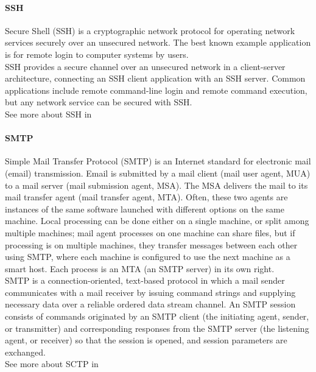\paragraph{SSH} 
Secure Shell (SSH) is a cryptographic network protocol for operating network services securely over an unsecured network. The best known example application is for remote login to computer systems by users.
\\
SSH provides a secure channel over an unsecured network in a client-server architecture, connecting an SSH client application with an SSH server. Common applications include remote command-line login and remote command execution, but any network service can be secured with SSH. 
\\
See more about SSH in \cite{SSH}


\paragraph{SMTP} 
Simple Mail Transfer Protocol (SMTP) is an Internet standard for electronic mail (email) transmission. Email is submitted by a mail client (mail user agent, MUA) to a mail server (mail submission agent, MSA). The MSA delivers the mail to its mail transfer agent (mail transfer agent, MTA). Often, these two agents are instances of the same software launched with different options on the same machine. Local processing can be done either on a single machine, or split among multiple machines; mail agent processes on one machine can share files, but if processing is on multiple machines, they transfer messages between each other using SMTP, where each machine is configured to use the next machine as a smart host. Each process is an MTA (an SMTP server) in its own right.
\\
SMTP is a connection-oriented, text-based protocol in which a mail sender communicates with a mail receiver by issuing command strings and supplying necessary data over a reliable ordered data stream channel. An SMTP session consists of commands originated by an SMTP client (the initiating agent, sender, or transmitter) and corresponding responses from the SMTP server (the listening agent, or receiver) so that the session is opened, and session parameters are exchanged.
\\
See more about SCTP in \cite{SMTP}


